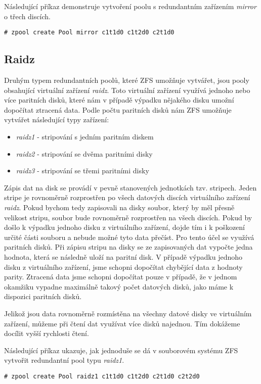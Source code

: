 Následující příkaz demonstruje vytvoření poolu s redundantním zařízením \emph{mirror} o třech discích.
\begin{verbatim}
# zpool create Pool mirror c1t1d0 c1t2d0 c2t1d0
\end{verbatim}

\subsection{Raidz}
Druhým typem redundantních poolů, které ZFS umožňuje vytvářet, jsou pooly obsahující virtuální zařízení \emph{raidz}. Toto virtuální zařízení využívá jednoho nebo více paritních disků, které nám v případě výpadku nějakého disku umožní dopočítat ztracená data. Podle počtu paritních disků nám ZFS umožňuje vytvářet následující typy zařízení:
\begin{itemize}
  \item \emph{raidz1} - stripování s jedním paritním diskem
  \item \emph{raidz2} - stripování se dvěma paritními disky
  \item \emph{raidz3} - stripování se třemi paritními disky
\end{itemize}

Zápis dat na disk se provádí v pevně stanovených jednotkách tzv. stripech. Jeden stripe je rovnoměrně rozprostřen po všech datových discích virtuálního zařízení \emph{raidz}. Pokud bychom tedy zapisovali na disky soubor, který by měl přesně velikost stripu, soubor bude rovnoměrně rozprostřen na všech discích. Pokud by došlo k výpadku jednoho disku z virtuálního zařízení, dojde tím i k poškození určité části souboru a nebude možné tyto data přečíst. Pro tento účel se využívá paritních disků. Při zápisu stripu na disky se ze zapisovaných dat vypočte jedna hodnota, která se následně uloží na paritní disk. V případě výpadku jednoho disku z virtuálního zařízení, jsme schopni dopočítat chybějící data z hodnoty parity. Ztracená data jsme schopni dopočítat pouze v případě, že v jednom okamžiku vypadne maximálně takový počet datových disků, jako máme k dispozici paritních disků.

Jelikož jsou data rovnoměrně rozmístěna na všechny datové disky ve virtuálním zařízení, můžeme při čtení dat využívat více disků najednou. Tím dokážeme docílit vyšší rychlosti čtení.

Následující příkaz ukazuje, jak jednoduše se dá v souborovém systému ZFS vytvořit redundantní pool typu \emph{raidz1}.
\begin{verbatim}
# zpool create Pool raidz1 c1t1d0 c1t2d0 c2t1d0 c2t2d0
\end{verbatim}

